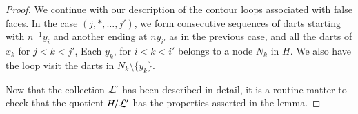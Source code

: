\begin{proof}
We continue with our description of the contour loops associated
with false faces.
In the case $(j,*,\ldots,j')$, we form consecutive sequences of darts
starting with $n^{-1} y_i$ and another ending at 
$n y_{i'}$ as in the previous case, and
all the darts of $x_k$ for $j<k<j'$, 
Each $y_k$, for $i < k < i'$ belongs to a node $N_k$ in $H$.
We also have the loop visit the darts in $N_k\setminus\{y_k\}$.

Now that the collection ${\cal L}'$ has been described in detail,
it is a routine matter to check that the quotient $H/{\cal L}'$
has the properties asserted in the lemma.
%
%

\end{proof}
